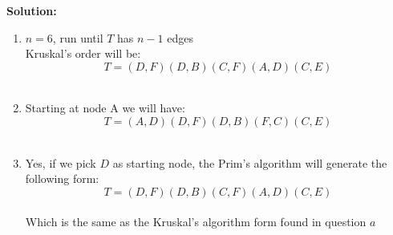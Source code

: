 \documentclass[9pt]{article}
\begin{document}
  \if
  \vspace{2mm}

  \textbf{Solution:}   \\
\begin{enumerate}
    \item 
        $n=6$, run until $T$ has $n-1$ edges \\
        Kruskal's order will be: \\
        $$T = (D,F) (D,B) (C,F) (A,D) (C,E)$$\\
    \item
        Starting at node A we will have:\\
        $$T = (A,D) (D,F) (D,B) (F,C) (C,E)$$\\
    
    \item
        Yes, if we pick $D$ as starting node, the Prim's algorithm will generate the following form:\\
        $$T = (D,F) (D,B) (C,F) (A,D) (C,E)$$\\
        Which is the same as the Kruskal's algorithm form found in question $a$\\
 \end{enumerate}
 


\fi

\newpage



\vspace{5mm}

\item
\end{document}
